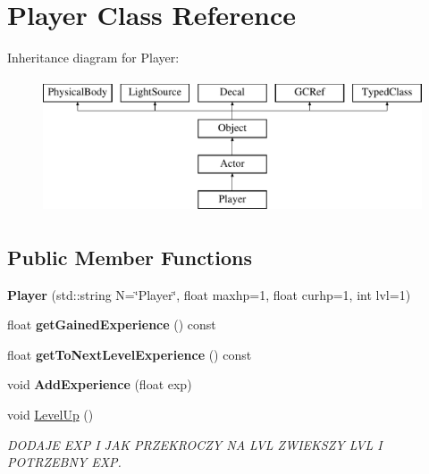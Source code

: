 \hypertarget{classPlayer}{}\section{Player Class Reference}
\label{classPlayer}
Inheritance diagram for Player\+:\begin{figure}[H]
\begin{center}
\leavevmode
\includegraphics[height=4.000000cm]{classPlayer}
\end{center}
\end{figure}
\subsection*{Public Member Functions}
\begin{DoxyCompactItemize}
\item 
\hypertarget{classPlayer_ae7423d709bb8ce4bd3c0a2abf6acfba0}{}{\bfseries Player} (std\+::string N=\char`\"{}Player\char`\"{}, float maxhp=1, float curhp=1, int lvl=1)\label{classPlayer_ae7423d709bb8ce4bd3c0a2abf6acfba0}

\item 
\hypertarget{classPlayer_a832c45eb6c4c3b7a85098eea14bff5c1}{}float {\bfseries get\+Gained\+Experience} () const \label{classPlayer_a832c45eb6c4c3b7a85098eea14bff5c1}

\item 
\hypertarget{classPlayer_a87007e274e6588713352a3836e6411a2}{}float {\bfseries get\+To\+Next\+Level\+Experience} () const \label{classPlayer_a87007e274e6588713352a3836e6411a2}

\item 
\hypertarget{classPlayer_a8b2c3f2f4e2247e2fb394c6868781d9b}{}void {\bfseries Add\+Experience} (float exp)\label{classPlayer_a8b2c3f2f4e2247e2fb394c6868781d9b}

\item 
\hypertarget{classPlayer_aae180f7a4a011ba1fd485e3d8728f489}{}void \hyperlink{classPlayer_aae180f7a4a011ba1fd485e3d8728f489}{Level\+Up} ()\label{classPlayer_aae180f7a4a011ba1fd485e3d8728f489}

\begin{DoxyCompactList}\small\item\em D\+O\+D\+A\+J\+E E\+X\+P I J\+A\+K P\+R\+Z\+E\+K\+R\+O\+C\+Z\+Y N\+A L\+V\+L Z\+W\+I\+E\+K\+S\+Z\+Y L\+V\+L I P\+O\+T\+R\+Z\+E\+B\+N\+Y E\+X\+P. \end{DoxyCompactList}\end{DoxyCompactItemize}
